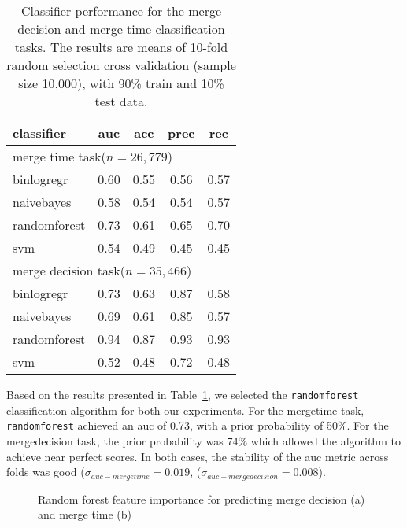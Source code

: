 \documentclass{sig-alternate}
\begin{document}
\begin{table}
  \centering
  \begin{tabular}{lcccc}
    \hline
    {\bf classifier} & {\sc auc} & {\sc acc} & {\sc prec} & {\sc rec} \\
    \hline
    \multicolumn{4}{l}{\textsf{merge time task}($n = 26,779$)} \\
    binlogregr    & 0.60 & 0.55 & 0.56 & 0.57  \\
    naivebayes    & 0.58 & 0.54 & 0.54 & 0.57  \\
    randomforest  & 0.73 & 0.61 & 0.65 & 0.70  \\
    svm           & 0.54 & 0.49 & 0.45 & 0.45  \\
    \hline
    \multicolumn{4}{l}{\textsf{merge decision task}($n = 35,466$)} \\
    binlogregr    & 0.73 & 0.63 & 0.87 & 0.58  \\
    naivebayes    & 0.69 & 0.61 & 0.85 & 0.57  \\
    randomforest  & 0.94 & 0.87 & 0.93 & 0.93  \\
    svm           & 0.52 & 0.48 & 0.72 & 0.48  \\
    \hline
  \end{tabular}
  \caption{Classifier performance for the merge decision and merge time
  classification tasks. The results are means of 10-fold random selection
  cross validation (sample size 10,000), with 90\% train and 10\% test data.}
  \label{tab:classif-perf}
\end{table}

Based on the results presented in Table~\ref{tab:classif-perf},
we selected the \texttt{randomforest} classification algorithm for
both our experiments. For the \textsf{mergetime} task, \texttt{randomforest}
achieved an {\sc auc} of 0.73, with a prior probability of 50\%. For 
the \textsf{mergedecision} task, the prior probability was 74\% which
allowed the algorithm to achieve near perfect scores. In both cases,
the stability of the {\sc auc} metric across folds was good 
($\sigma_{auc-mergetime} = 0.019$, ($\sigma_{auc-mergedecision} = 0.008$).

\begin{figure*}
\centering
{}
\caption{Random forest feature importance for predicting merge decision (a) and merge time (b)}
\label{fig:varimp}
\end{figure*}
\end{document}
